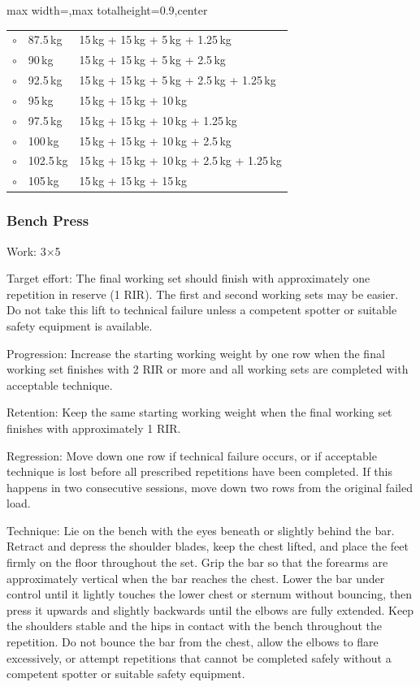 \documentclass[11pt,a4paper]{article}
\begin{document}
\begin{center}
\begin{adjustbox}{max width=\linewidth,max totalheight=0.9\textheight,center}
\begin{tabular}{cll}
$\circ$ & 87.5\,kg & 15\,kg + 15\,kg + 5\,kg + 1.25\,kg \\
$\circ$ & 90\,kg   & 15\,kg + 15\,kg + 5\,kg + 2.5\,kg \\
$\circ$ & 92.5\,kg & 15\,kg + 15\,kg + 5\,kg + 2.5\,kg + 1.25\,kg \\
$\circ$ & 95\,kg   & 15\,kg + 15\,kg + 10\,kg \\
$\circ$ & 97.5\,kg & 15\,kg + 15\,kg + 10\,kg + 1.25\,kg \\
$\circ$ & 100\,kg  & 15\,kg + 15\,kg + 10\,kg + 2.5\,kg \\
$\circ$ & 102.5\,kg & 15\,kg + 15\,kg + 10\,kg + 2.5\,kg + 1.25\,kg \\
$\circ$ & 105\,kg  & 15\,kg + 15\,kg + 15\,kg \\
\bottomrule
\end{tabular}
\end{adjustbox}
\renewcommand{\arraystretch}{1}
\end{center}

\newpage
\subsubsection{Bench Press}

Work: 3$\times$5

Target effort: The final working set should finish with approximately one repetition in reserve (1 RIR). The first and second working sets may be easier. Do not take this lift to technical failure unless a competent spotter or suitable safety equipment is available.

Progression: Increase the starting working weight by one row when the final working set finishes with 2 RIR or more and all working sets are completed with acceptable technique.

Retention: Keep the same starting working weight when the final working set finishes with approximately 1 RIR.

Regression: Move down one row if technical failure occurs, or if acceptable technique is lost before all prescribed repetitions have been completed. If this happens in two consecutive sessions, move down two rows from the original failed load.

Technique: Lie on the bench with the eyes beneath or slightly behind the bar. Retract and depress the shoulder blades, keep the chest lifted, and place the feet firmly on the floor throughout the set. Grip the bar so that the forearms are approximately vertical when the bar reaches the chest. Lower the bar under control until it lightly touches the lower chest or sternum without bouncing, then press it upwards and slightly backwards until the elbows are fully extended. Keep the shoulders stable and the hips in contact with the bench throughout the repetition. Do not bounce the bar from the chest, allow the elbows to flare excessively, or attempt repetitions that cannot be completed safely without a competent spotter or suitable safety equipment.
\end{document}
